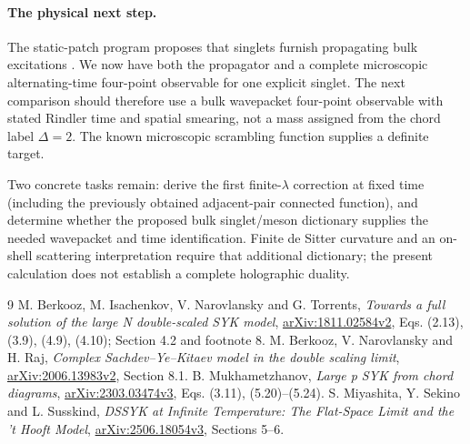 \documentclass[11pt,a4paper]{article}
\begin{document}
\paragraph{The physical next step.}
The static-patch program proposes that singlets furnish propagating
bulk excitations \cite{mss}. We now have both the propagator and a
complete microscopic alternating-time four-point observable for one
explicit singlet. The next comparison should therefore use a bulk
wavepacket four-point observable with stated Rindler time and spatial
smearing, not a mass assigned from the chord label $\Delta=2$.
The known microscopic scrambling function supplies a definite target.

Two concrete tasks remain: derive the first finite-$\lambda$ correction
at fixed time (including the previously obtained adjacent-pair
connected function), and determine whether the proposed bulk
singlet/meson dictionary supplies the needed wavepacket and time
identification. Finite de Sitter curvature and an on-shell scattering
interpretation require that additional dictionary; the present
calculation does not establish a complete holographic duality.

\begin{thebibliography}{9}\small
{} M. Berkooz, M. Isachenkov, V. Narovlansky and G. Torrents,
\emph{Towards a full solution of the large N double-scaled SYK model},
\href{https://arxiv.org/abs/1811.02584v2}{arXiv:1811.02584v2},
Eqs. (2.13), (3.9), (4.9), (4.10); Section 4.2 and footnote 8.
 M. Berkooz, V. Narovlansky and H. Raj,
\emph{Complex Sachdev--Ye--Kitaev model in the double scaling limit},
\href{https://arxiv.org/abs/2006.13983v2}{arXiv:2006.13983v2}, Section 8.1.
 B. Mukhametzhanov,
\emph{Large p SYK from chord diagrams},
\href{https://arxiv.org/abs/2303.03474v3}{arXiv:2303.03474v3},
Eqs. (3.11), (5.20)--(5.24).
 S. Miyashita, Y. Sekino and L. Susskind,
\emph{DSSYK at Infinite Temperature: The Flat-Space Limit and the 't Hooft Model},
\href{https://arxiv.org/abs/2506.18054v3}{arXiv:2506.18054v3}, Sections 5--6.
\end{thebibliography}
\end{document}
